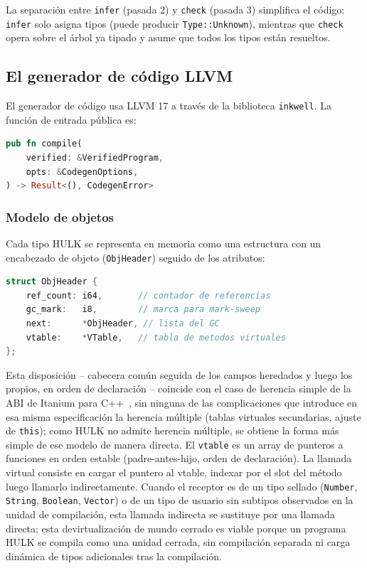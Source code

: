 \documentclass[12pt, a4paper]{article}
\begin{document}
La separaci\'{o}n entre \texttt{infer} (pasada 2) y \texttt{check} (pasada 3)
simplifica el c\'{o}digo: \texttt{infer} solo asigna tipos (puede producir
\texttt{Type::Unknown}), mientras que \texttt{check} opera sobre el \'{a}rbol ya
tipado y asume que todos los tipos est\'{a}n resueltos.

\subsection{El generador de c\'{o}digo LLVM}

El generador de c\'{o}digo usa LLVM 17 a trav\'{e}s de la biblioteca
\texttt{inkwell}. La funci\'{o}n de entrada p\'{u}blica es:

\begin{lstlisting}[language=Rust, caption={API p\'{u}blica de hulk-codegen},
                   label=lst:codegen-api]
pub fn compile(
    verified: &VerifiedProgram,
    opts: &CodegenOptions,
) -> Result<(), CodegenError>
\end{lstlisting}

\subsubsection{Modelo de objetos}

Cada tipo HULK se representa en memoria como una estructura con un
encabezado de objeto (\texttt{ObjHeader}) seguido de los atributos:

\begin{lstlisting}[language=C, caption={Layout de objetos en memoria},
                   label=lst:obj-layout]
struct ObjHeader {
    ref_count: i64,       // contador de referencias
    gc_mark:   i8,        // marca para mark-sweep
    next:      *ObjHeader, // lista del GC
    vtable:    *VTable,   // tabla de metodos virtuales
};
\end{lstlisting}

Esta disposición -- cabecera común seguida de los campos heredados y luego
los propios, en orden de declaración -- coincide con el caso de herencia
simple de la ABI de Itanium para C++~\cite{itanium-abi}, sin ninguna de las
complicaciones que introduce en esa misma especificación la herencia múltiple
(tablas virtuales secundarias, ajuste de \texttt{this}); como HULK no admite
herencia múltiple, se obtiene la forma más simple de ese modelo de manera
directa. El \texttt{vtable} es un array de punteros a funciones en orden estable
(padre-antes-hijo, orden de declaraci\'{o}n). La llamada virtual consiste en cargar el puntero al vtable, indexar por el slot del m\'{e}todo luego llamarlo indirectamente.
Cuando el receptor es de un tipo sellado (\texttt{Number}, \texttt{String},
\texttt{Boolean}, \texttt{Vector}) o de un tipo de usuario sin subtipos
observados en la unidad de compilación, esta llamada indirecta se sustituye por
una llamada directa; esta devirtualización de mundo cerrado es viable porque un
programa HULK se compila como una unidad cerrada, sin compilación separada ni
carga dinámica de tipos adicionales tras la compilación.
\end{document}
